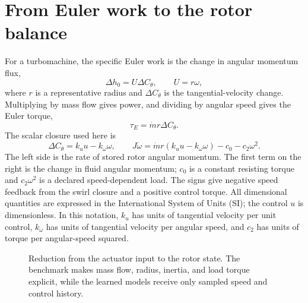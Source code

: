 \documentclass[10pt,journal]{IEEEtran}
\begin{document}
\section{From Euler work to the rotor balance}
For a turbomachine, the specific Euler work is the change in angular momentum flux,
\begin{equation}
 \Delta h_0=U\Delta C_\theta, \qquad U=r\omega,
 \label{eq:euler}
\end{equation}
where $r$ is a representative radius and $\Delta C_\theta$ is the tangential-velocity change. Multiplying by mass flow gives power, and dividing by angular speed gives the Euler torque,
\begin{equation}
 \tau_E=\dot m r\Delta C_\theta.
 \label{eq:torque}
\end{equation}
The scalar closure used here is
\begin{equation}
 \Delta C_\theta=k_u u-k_\omega\omega,
 \qquad
 J\dot\omega=\dot m r(k_u u-k_\omega\omega)-c_0-c_2\omega^2.
 \label{eq:truth}
\end{equation}
The left side is the rate of stored rotor angular momentum. The first term on the right is the change in fluid angular momentum; $c_0$ is a constant resisting torque and $c_2\omega^2$ is a declared speed-dependent load. The signs give negative speed feedback from the swirl closure and a positive control torque. All dimensional quantities are expressed in the International System of Units (SI); the control $u$ is dimensionless. In this notation, $k_u$ has units of tangential velocity per unit control, $k_\omega$ has units of tangential velocity per angular speed, and $c_2$ has units of torque per angular-speed squared.

\begin{figure}[!t]
 \centering
 \resizebox{0.88\textwidth}{!}{}
 \caption{Reduction from the actuator input to the rotor state. The benchmark makes mass flow, radius, inertia, and load torque explicit, while the learned models receive only sampled speed and control history.}
 \label{fig:physical}
\end{figure}
\end{document}
